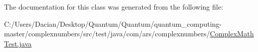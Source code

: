 The documentation for this class was generated from the following file\+:\begin{DoxyCompactItemize}
\item 
C\+:/\+Users/\+Dacian/\+Desktop/\+Quantum/\+Quantum/quantum\+\_\+computing-\/master/complexnumbers/src/test/java/com/ars/complexnumbers/\hyperlink{_complex_math_test_8java}{Complex\+Math\+Test.\+java}\end{DoxyCompactItemize}
